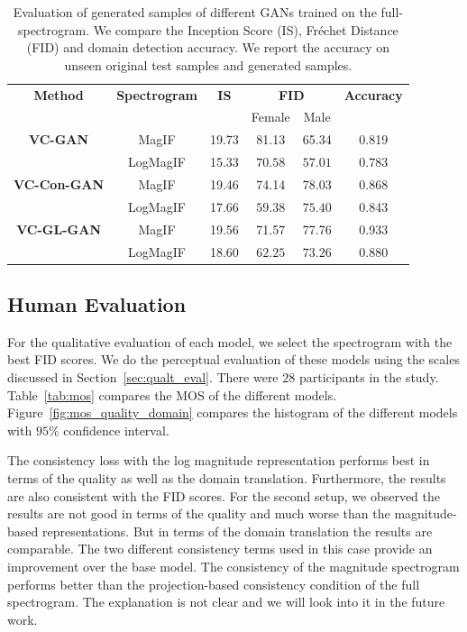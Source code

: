 \begin{table}[h]
    \centering
    \begin{tabular}{cccccc}
    \toprule
    \textbf{Method}     & \textbf{Spectrogram} & \textbf{IS} & \multicolumn{2}{c}{\textbf{FID}} & \textbf{Accuracy}\\
    & & & Female & Male & \\
    \midrule
     \textbf{VC-GAN}    & MagIF &19.73 & 81.13& 65.34 & 0.819 \\
         & LogMagIF& 15.33&$\mathbf{70.58}$ &$\mathbf{57.01}$ &0.783\\ 
    \midrule
     \textbf{VC-Con-GAN}    & MagIF &19.46 &74.14 &78.03 &0.868 \\
         & LogMagIF & 17.66& $\mathbf{59.38}$&$\mathbf{75.40}$ & 0.843\\
    \midrule
     \textbf{VC-GL-GAN}  & MagIF &19.56 &71.57& 77.76& 0.933\\
         & LogMagIF &18.60&$\mathbf{62.25}$ &$\mathbf{73.26}$ & 0.880\\          
    \bottomrule 
    \end{tabular}
    \caption[Evaluation of generated samples of different GANs trained on the full-spectrogram.]{Evaluation of generated samples of different GANs trained on the full-spectrogram. We compare the Inception Score (IS), Fr\'{e}chet Distance (FID) and domain detection accuracy. We report the accuracy on unseen original test samples and generated samples.}
    \label{tab:eval_gan_full}
\end{table}




\subsection{Human Evaluation}
\label{subsec:human_eval}
For the qualitative evaluation of each model, we select the spectrogram with the best FID scores. We do the perceptual evaluation of these models using the scales discussed in Section~\ref{sec:qualt_eval}. There were $28$ participants in the study.
Table~\ref{tab:mos} compares the MOS of the different models. Figure~\ref{fig:mos_quality_domain} compares the histogram of the different models with $95\%$ confidence interval.

The consistency loss with the log magnitude representation performs best in terms of the quality as well as the domain translation. Furthermore, the results are also consistent with the FID scores. For the second setup, we observed the results are not good in terms of the quality and much worse than the magnitude-based representations. But in terms of the domain translation the results are comparable. The two different consistency terms used in this case provide an improvement over the base model. The consistency of the magnitude spectrogram performs better than the projection-based consistency condition of the full spectrogram. The explanation is not clear and we will look into it in the future work.

